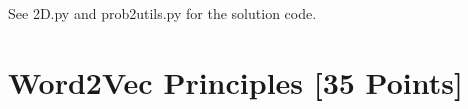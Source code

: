 \newpage
\problem[10]

\begin{solution}
See 2D.py and prob2utils.py for the solution code.
\end{solution}

\newpage
\problem[5]

\begin{solution}

%


\end{solution}

\newpage
\problem[5]

\begin{solution}




 
\end{solution}






\newpage
\section{Word2Vec Principles [35 Points]}

\problem[5]


